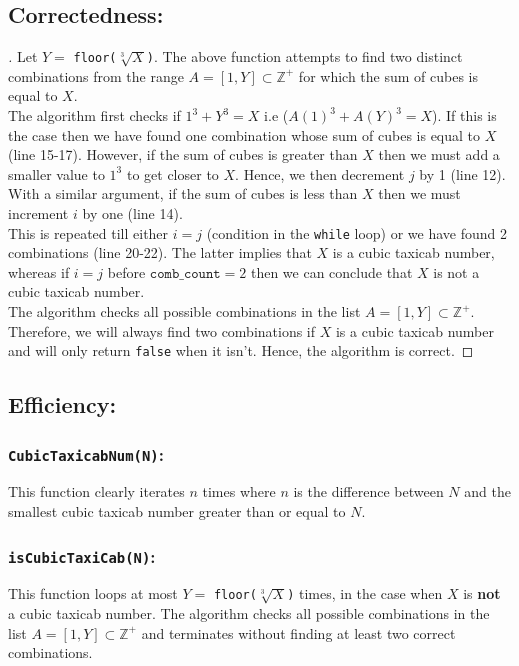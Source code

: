\documentclass[12pt]{report}
\begin{document}
\subsection{Correctedness:}
\begin{proof}[\unskip\nopunct]
Let $Y=$ \texttt{floor($\sqrt[3]{X}$)}. The above function attempts to find two distinct combinations from the range $A=[1,Y]\subset \mathbb{Z^+}$ for which the sum of cubes is equal to $X$. \\ 

The algorithm first checks if $1^3+Y^3=X$ i.e ($A(1)^3+A(Y)^3 = X$). If this is the case then we have found one combination whose sum of cubes is equal to $X$ (line 15-17). However, if the sum of cubes is greater than $X$ then we must add a smaller value to $1^3$ to get closer to $X$. Hence, we then decrement $j$ by 1 (line 12). With a similar argument, if the sum of cubes is less than $X$ then we must increment $i$ by one (line 14). \\

This is repeated till either $i=j$ (condition in the \texttt{while} loop) or we have found 2 combinations (line 20-22). The latter implies that $X$ is a cubic taxicab number, whereas if $i=j$ before $\texttt{comb\_count}=2$ then we can conclude that $X$ is not a cubic taxicab number. \\

The algorithm checks all possible combinations in the list $A = [1,Y] \subset \mathbb{Z^+}$. Therefore, we will always find two combinations if $X$ is a cubic taxicab number and will only return \texttt{false} when it isn't. Hence, the algorithm is correct.
\end{proof}

\subsection{Efficiency:}
\subsubsection{\texttt{CubicTaxicabNum(N)}:}
This function clearly iterates $n$ times where $n$ is the difference between $N$ and the smallest cubic taxicab number greater than or equal to $N$.

\subsubsection{\texttt{isCubicTaxiCab(N)}:}
This function loops at most $Y=$ \texttt{floor($\sqrt[3]{X}$)} times, in the case when $X$ is \textbf{not} a cubic taxicab number. The algorithm checks all possible combinations in the list $A=[1,Y]\subset\mathbb{Z^+}$ and terminates without finding at least two correct combinations. \\
\end{document}
